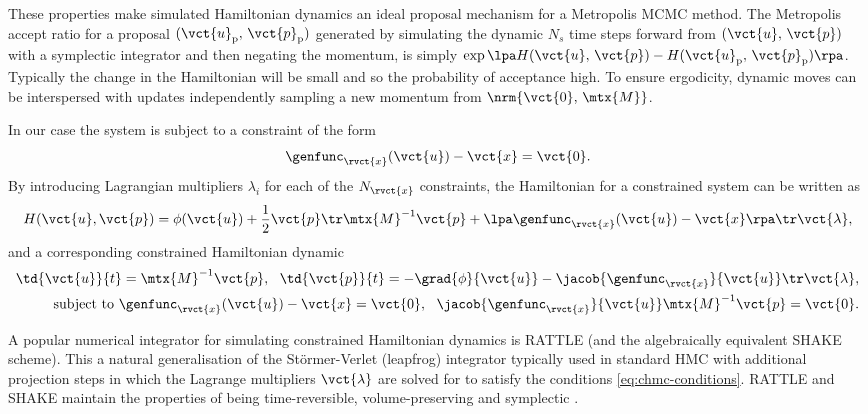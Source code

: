 These properties make simulated Hamiltonian dynamics an ideal proposal mechanism for a Metropolis \ac{MCMC} method. The Metropolis accept ratio for a proposal $(\vct{u}_{\text{p}},\,\vct{p}_{\text{p}})$ generated by simulating the dynamic $N_s$ time steps forward from $(\vct{u},\, \vct{p})$ with a symplectic integrator and then negating the momentum, is simply $\exp\lpa H(\vct{u},\,\vct{p}) - H(\vct{u}_{\text{p}},\,\vct{p}_{\text{p}})\rpa$. Typically the change in the Hamiltonian will be small and so the probability of acceptance high. To ensure ergodicity, dynamic moves can be interspersed with updates independently sampling a new momentum from $\nrm{\vct{0},\,\mtx{M}}$.

In our case the system is subject to a constraint of the form
\begin{equation}\label{eq:constraint-def}
  \genfunc_{\rvct{x}}(\vct{u}) - \vct{x} = \vct{0}.
\end{equation}
By introducing Lagrangian multipliers $\lambda_i$ for each of the $N_{\rvct{x}}$ constraints, the Hamiltonian for a constrained system can be written as
\begin{equation}\label{eq:constrained_hamiltonian}
    H(\vct{u}, \vct{p}) = 
    \phi(\vct{u}) + \frac{1}{2}\vct{p}\tr\mtx{M}^{-1}\vct{p}
    + \lpa \genfunc_{\rvct{x}}(\vct{u}) - \vct{x} \rpa\tr\vct{\lambda},
\end{equation}
and a corresponding constrained Hamiltonian dynamic
\begin{align}\label{eq:constrained_hamiltonian_dynamics}
    \td{\vct{u}}{t} = \mtx{M}^{-1}\vct{p},
    ~~
    \td{\vct{p}}{t} = -\grad{\phi}{\vct{u}} - \jacob{\genfunc_{\rvct{x}}}{\vct{u}}\tr\vct{\lambda},
    \\
    \text{subject to }
    \genfunc_{\rvct{x}}(\vct{u}) - \vct{x} = \vct{0},
    ~~
    \jacob{\genfunc_{\rvct{x}}}{\vct{u}}\mtx{M}^{-1}\vct{p} = \vct{0}.\label{eq:chmc-conditions}
\end{align}

A popular numerical integrator for simulating constrained Hamiltonian dynamics is RATTLE \citep{andersen1983rattle} (and the algebraically equivalent SHAKE \citep{ryckaert1977numerical} scheme). This a natural generalisation of the St\"{o}rmer-Verlet (leapfrog) integrator typically used in standard \ac{HMC} with additional projection steps in which the Lagrange multipliers $\vct{\lambda}$ are solved for to satisfy the conditions \eqref{eq:chmc-conditions}. RATTLE and SHAKE maintain the properties of being time-reversible, volume-preserving and symplectic \citep{leimkuhler1994symplectic}.

